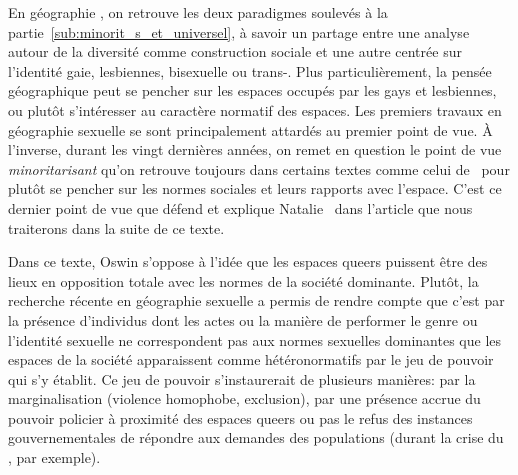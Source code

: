 
En géographie \qu{}, on retrouve les deux paradigmes soulevés à la partie~\ref{sub:minorit_s_et_universel}, à savoir un partage entre une analyse autour de la diversité comme construction sociale et une autre centrée sur l'identité gaie, lesbiennes, bisexuelle ou trans-. 
Plus particulièrement, la pensée géographique peut se pencher sur les espaces occupés par les gays et lesbiennes, ou plutôt s'intéresser au caractère normatif des espaces. 
Les premiers travaux en géographie sexuelle se sont principalement attardés au premier point de vue. 
À l'inverse, durant les vingt dernières années, on remet en question le point de vue \emph{minoritarisant} qu'on retrouve toujours dans certains textes comme celui de~\citet{Sinfield1996} pour plutôt se pencher sur les normes sociales et leurs rapports avec l'espace. 
C'est ce dernier point de vue que défend et explique Natalie~\citet{Oswin2008} dans l'article  que nous traiterons dans la suite de ce texte.

Dans ce texte, Oswin s'oppose à l'idée que les espaces queers puissent être des lieux en opposition totale avec les normes de la société dominante. 
Plutôt, la recherche récente en géographie sexuelle a permis de rendre compte que c'est par la présence d'individus dont les actes ou la manière de performer le genre ou l'identité sexuelle ne correspondent pas aux normes sexuelles dominantes que les espaces de la société apparaissent comme hétéronormatifs par le jeu de pouvoir qui s'y établit. 
Ce jeu de pouvoir s'instaurerait de plusieurs manières: par la marginalisation (violence homophobe, exclusion), par une présence accrue du pouvoir policier à proximité des espaces queers ou pas le refus des instances gouvernementales de répondre aux demandes des populations \lgbt{} (durant la crise du \sida, par exemple).

